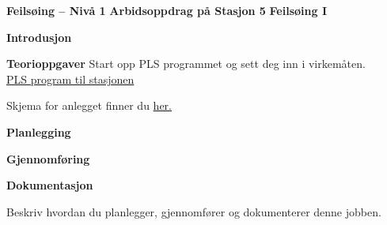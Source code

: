 

\noindent

\vskip 5pt

\vskip 5pt
\begin{center}
\textbf{Feilsøing -- Nivå 1 }
\vskip 5pt 
\textbf{Arbidsoppdrag på Stasjon 5}
\vskip 5pt 
\textbf{Feilsøing I}
\end{center}

\vskip 10pt 
\textbf{Introdusjon}

\vskip 5pt 

\vskip 5pt 


\vskip 10pt 
\textbf{Teorioppgaver}
Start opp PLS programmet og sett deg inn i virkemåten.\\
\href{https://rfka-my.sharepoint.com/:u:/g/personal/fred-olav_mosdal_skole_rogfk_no/Ebw4MugqIk9IkNW0xOTeOtMBU5aTkfC_XWkhlCSTiTU62A?e=qM1QLI}{PLS program til stasjonen}

\vskip 5pt 
Skjema for anlegget finner du \href{https://rfka-my.sharepoint.com/:u:/g/personal/fred-olav_mosdal_skole_rogfk_no/EfUrPOgJexZLiXL5tWK_tVIBmfgED9RbsoItP9EguvaPCg?e=f5Ydh4}{her.}


\vskip 5pt 

\vskip 10pt 
\textbf{Planlegging}


\vskip 10pt 
\textbf{Gjennomføring}

\vskip 10pt 
\textbf{Dokumentasjon}

Beskriv hvordan du planlegger, gjennomfører og dokumenterer denne jobben. 






















\vfil \eject

















